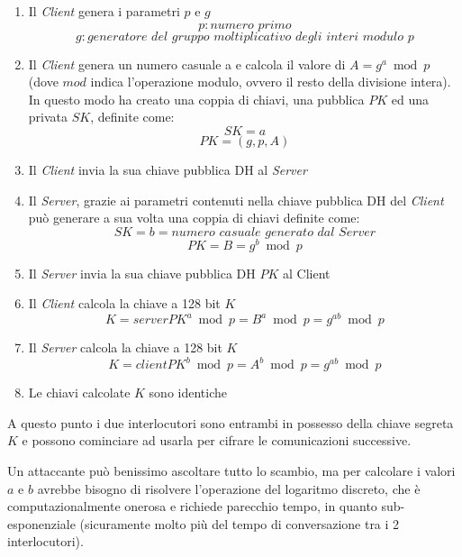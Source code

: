 \documentclass[12pt]{article}
\begin{document}
\begin{enumerate}

\item Il \textit{Client} genera i parametri $p$ e $g$
$$
p: \textit{numero primo}
$$
$$
g: \textit{generatore del gruppo moltiplicativo degli interi modulo p}
$$

\item Il \textit{Client} genera un numero casuale a e calcola il valore di $A = g^a \bmod p$ (dove $mod$ indica l'operazione modulo, ovvero il resto della divisione intera).
\\
In questo modo ha creato una coppia di chiavi, una pubblica $PK$ ed una privata $SK$, definite come:
$$
SK = a
$$
$$
PK = (g,p,A)
$$

\item Il \textit{Client} invia la sua chiave pubblica DH al \textit{Server}

\item Il \textit{Server}, grazie ai parametri contenuti nella chiave pubblica DH del \textit{Client} può generare a sua volta una coppia di chiavi definite come:
$$
SK = b = \textit{numero casuale generato dal Server}
$$
$$
PK = B = g^b \bmod p
$$

\item Il \textit{Server} invia la sua chiave pubblica DH $PK$ al Client

\item Il \textit{Client} calcola la chiave a 128 bit $K$
$$
K = serverPK^a \bmod p = B^a \bmod p = g^{ab} \bmod p
$$

\item Il \textit{Server} calcola la chiave a 128 bit $K$
$$
K = clientPK^b \bmod p = A^b \bmod p = g^{ab} \bmod p
$$

\item Le chiavi calcolate $K$ sono identiche

\end{enumerate}

\noindent
A questo punto i due interlocutori sono entrambi in possesso della chiave segreta $K$ e possono cominciare ad usarla per cifrare le comunicazioni successive.
\par
Un attaccante può benissimo ascoltare tutto lo scambio, ma per calcolare i valori $a$ e $b$ avrebbe bisogno di risolvere l'operazione del logaritmo discreto, che è computazionalmente onerosa e richiede parecchio tempo, in quanto sub-esponenziale (sicuramente molto più del tempo di conversazione tra i 2 interlocutori).
\end{document}
